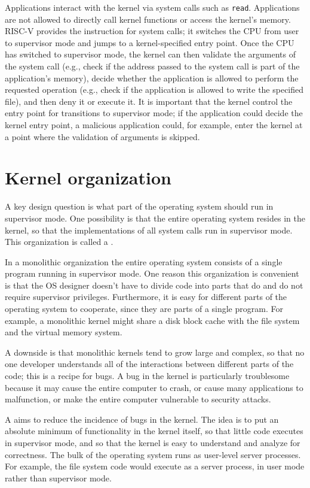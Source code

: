 Applications interact with the kernel via system calls
such as {\tt read}.
Applications are not allowed to directly call kernel functions
or access the kernel's memory.
RISC-V provides the  instruction
for system calls; it switches the CPU from user to supervisor mode
and jumps to a kernel-specified entry point.
Once the CPU has switched to supervisor mode,
the kernel can then validate the arguments of the system call (e.g.,
check if the address passed to the system call is part of the application's memory), decide whether
the application is allowed to perform the requested operation (e.g.,
check if the application is allowed to write the specified file), and then deny it
or execute it.  It is important that the kernel control the entry point for
transitions to supervisor mode; if the application could decide the kernel entry
point, a malicious application could, for example, enter the kernel at a point where the
validation of arguments is skipped.

\section{Kernel organization}

A key design question is what part of the operating
system should run in supervisor mode. 
One possibility is that the entire operating system resides
in the kernel, so that the implementations of all system calls
run in supervisor mode.
This organization is called a
.

In a monolithic organization the entire operating system consists of a single
program running in supervisor mode.
One reason this organization is convenient is that the OS designer
doesn't have to divide code into parts that do and do not
require supervisor privileges.
Furthermore, it is easy for different parts of the operating system to
cooperate, since they are parts of a single program.
For example, a monolithic kernel might share a disk block cache 
with the file system and the virtual memory system. 

A downside is that monolithic kernels tend to grow large
and complex, so that no one developer understands all of 
the interactions between different parts of the code;
this is a recipe for bugs. A bug in the kernel is particularly
troublesome because it may cause the entire computer to crash,
or cause many applications to malfunction,
or make the entire computer vulnerable to security attacks.

A  aims to reduce the incidence of bugs in the
kernel. The idea is to put an absolute minimum of functionality in the
kernel itself, so that little code executes in supervisor mode, and so
that the kernel is easy to understand and analyze for correctness. The
bulk of the operating system runs as user-level server processes. For
example, the file system code would execute as a server process, in
user mode rather than supervisor mode.

